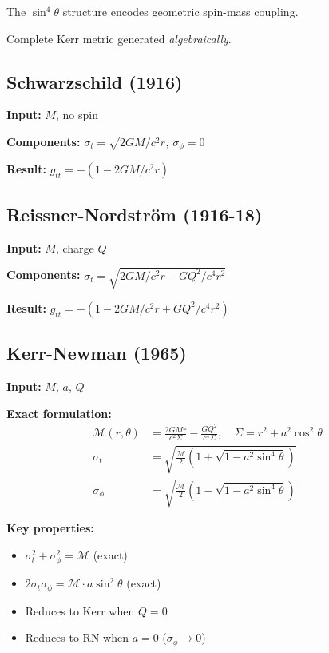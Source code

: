 \documentclass[11pt,a4paper]{article}
\theoremstyle{definition}
\theoremstyle{remark}
\begin{document}
	The $\sin^4\theta$ structure encodes geometric spin-mass coupling.
	
	Complete Kerr metric generated \emph{algebraically}.
	
	\subsection{Schwarzschild (1916)}
	
	\textbf{Input:} $M$, no spin
	
	\textbf{Components:} $\sigma_t = \sqrt{2GM/c^2r}$, $\sigma_\phi = 0$
	
	\textbf{Result:} $g_{tt} = -(1 - 2GM/c^2r)$ \quad \checkmark
	
	\subsection{Reissner-Nordström (1916-18)}
	
	\textbf{Input:} $M$, charge $Q$
	
	\textbf{Components:} $\sigma_t = \sqrt{2GM/c^2r - GQ^2/c^4r^2}$
	
	\textbf{Result:} $g_{tt} = -(1 - 2GM/c^2r + GQ^2/c^4r^2)$ \quad \checkmark
	
	\subsection{Kerr-Newman (1965)}
	
	\textbf{Input:} $M$, $a$, $Q$
	
	\textbf{Exact formulation:}
	\begin{align}
		\mathcal{M}(r,\theta) &= \frac{2GMr}{c^2\Sigma} - \frac{GQ^2}{c^4\Sigma}, \quad \Sigma = r^2 + a^2\cos^2\theta\\
		\sigma_t &= \sqrt{\frac{\mathcal{M}}{2}\left(1 + \sqrt{1 - a^2\sin^4\theta}\right)}\\
		\sigma_\phi &= \sqrt{\frac{\mathcal{M}}{2}\left(1 - \sqrt{1 - a^2\sin^4\theta}\right)}
	\end{align}
	
	\textbf{Key properties:}
	\begin{itemize}
		\item $\sigma_t^2 + \sigma_\phi^2 = \mathcal{M}$ (exact)
		\item $2\sigma_t\sigma_\phi = \mathcal{M} \cdot a\sin^2\theta$ (exact)
		\item Reduces to Kerr when $Q=0$
		\item Reduces to RN when $a=0$ ($\sigma_\phi \to 0$)
	\end{itemize}
	
\end{document}
